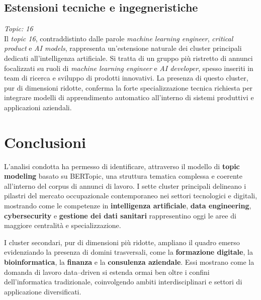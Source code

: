 \subsection{Estensioni tecniche e ingegneristiche}
\textit{Topic: 16} \\
Il \textit{topic 16}, contraddistinto dalle parole \emph{machine learning engineer}, \emph{critical product} e \emph{AI models}, rappresenta un’estensione naturale dei cluster principali dedicati all’intelligenza artificiale.
Si tratta di un gruppo più ristretto di annunci focalizzati su ruoli di \emph{machine learning engineer} e \emph{AI developer}, spesso inseriti in team di ricerca e sviluppo di prodotti innovativi.
La presenza di questo cluster, pur di dimensioni ridotte, conferma la forte specializzazione tecnica richiesta per integrare modelli di apprendimento automatico all’interno di sistemi produttivi e applicazioni aziendali.
\noindent

\section*{Conclusioni}

L’analisi condotta ha permesso di identificare, attraverso il modello di \textbf{topic modeling} basato su BERTopic, una struttura tematica complessa e coerente all’interno del corpus di annunci di lavoro.
I sette cluster principali delineano i pilastri del mercato occupazionale contemporaneo nei settori tecnologici e digitali, mostrando come le competenze in \textbf{intelligenza artificiale}, \textbf{data engineering}, \textbf{cybersecurity} e \textbf{gestione dei dati sanitari} rappresentino oggi le aree di maggiore centralità e specializzazione.

I cluster secondari, pur di dimensioni più ridotte, ampliano il quadro emerso evidenziando la presenza di domini trasversali, come la \textbf{formazione digitale}, la \textbf{bioinformatica}, la \textbf{finanza} e la \textbf{consulenza aziendale}.
Essi mostrano come la domanda di lavoro data–driven si estenda ormai ben oltre i confini dell’informatica tradizionale, coinvolgendo ambiti interdisciplinari e settori di applicazione diversificati.
